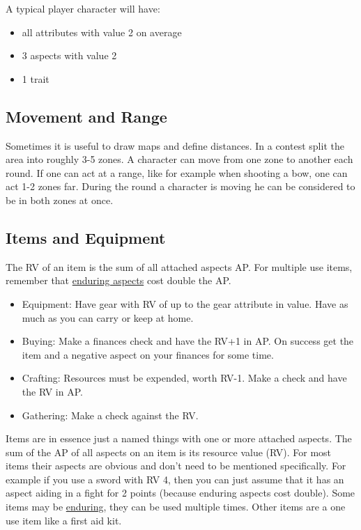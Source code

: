 \documentclass[11pt]{article}
\begin{document}
{\begin{short}
A typical player character will have:
\begin{itemize}
\item all attributes with value 2 on average
\item 3 aspects with value 2
\item 1 trait
\end{itemize}
\end{short}
\subsection{Movement and Range}
\label{sec:org0fd5de9}
\begin{short}
Sometimes it is useful to draw maps and define distances. In a contest split the area into roughly 3-5 zones. A character can move from one zone to another each round. If one can act at a range, like for example when shooting a bow, one can act 1-2 zones far. During the round a character is moving he can be considered to be in both zones at once.
\end{short}
\subsection{Items and Equipment}
\label{sec:org16f99e0}
\begin{short}
The RV of an item is the sum of all attached aspects AP. For multiple use items, remember that \hyperref[sec:orgd4ba133]{enduring aspects} cost double the AP.
\begin{itemize}
\item Equipment: Have gear with RV of up to the gear attribute in value. Have as much as you can carry or keep at home.
\item Buying: Make a finances check and have the RV+1 in AP. On success get the item and a negative aspect  on your finances for some time.
\item Crafting: Resources must be expended, worth RV-1. Make a check and have the RV in AP.
\item Gathering: Make a check against the RV.
\end{itemize}
\end{short}

Items are in essence just a named things with one or more attached aspects. The sum of the AP of all aspects on an item is its resource value (RV). For most items their aspects are obvious and don't need to be mentioned specifically. For example if you use a sword with RV 4, then you can just assume that it has an aspect aiding in a fight for 2 points (because enduring aspects cost double). Some items may be \hyperref[sec:orgd4ba133]{enduring}, they can be used multiple times. Other items are a one use item like a first aid kit. 

}
\end{document}
